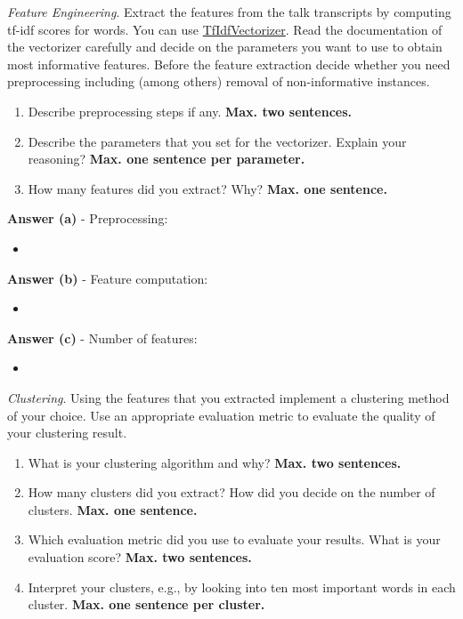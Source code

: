 \documentclass[a4paper,10pt]{article}
\begin{document}
\begin{enumerate}[topsep=0mm, partopsep=0mm, leftmargin=*]

{\color{blue}	
\item\textit{Feature Engineering}. Extract the features from the talk transcripts by computing tf-idf scores for words. You can use \href{https://scikit-learn.org/stable/modules/generated/sklearn.feature_extraction.text.TfidfVectorizer.html}{TfIdfVectorizer}. Read the documentation of the vectorizer carefully and decide on the parameters you want to use to obtain most informative features. Before the feature extraction decide whether you need preprocessing including (among others) removal of non-informative instances.
\begin{enumerate}
	\item Describe preprocessing steps if any. {\color{red}\textbf{Max. two sentences.}}
	\item Describe the parameters that you set for the vectorizer. Explain your reasoning? {\color{red}\textbf{Max. one sentence per parameter.}}
	\item How many features did you extract? Why? {\color{red}\textbf{Max. one sentence.}}
\end{enumerate}
}


\textbf{Answer (a)} - Preprocessing:
\begin{itemize}
	\item 
\end{itemize}

\textbf{Answer (b)} - Feature computation:
\begin{itemize}
	\item 
\end{itemize}

\textbf{Answer (c)} - Number of features:
\begin{itemize}
	\item
\end{itemize}


\clearpage
{\color{blue}
	\clearpage\item\textit{Clustering}. Using the features that you extracted implement a clustering method of your choice. Use an appropriate evaluation metric to evaluate the quality of your clustering result.
	\begin{enumerate}
		\item What is your clustering algorithm and why? {\color{red}\textbf{Max. two sentences.}}
		\item How many clusters did you extract? How did you decide on the number of clusters. {\color{red}\textbf{Max. one sentence.}}
		\item Which evaluation metric did you use to evaluate your results. What is your evaluation score? {\color{red}\textbf{Max. two sentences.}}
		\item Interpret your clusters, e.g., by looking into ten most important words in each cluster. {\color{red}\textbf{Max. one sentence per cluster.}}
\end{enumerate}}


\end{enumerate}
\end{document}
